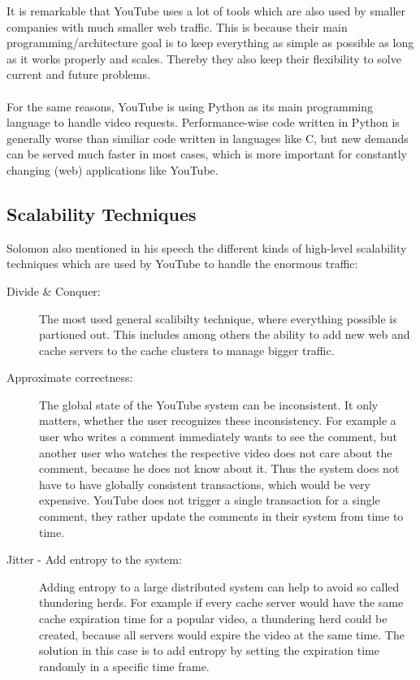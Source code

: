 It is remarkable that YouTube uses a lot of tools which are also used by smaller companies with much smaller web traffic. This is because their main programming/architecture goal is to keep everything as simple as possible as long as it works properly and scales. Thereby they also keep their flexibility to solve current and future problems.\\
\\
For the same reasons, YouTube is using Python as its main programming language to handle video requests. Performance-wise code written in Python is generally worse than similiar code written in languages like C, but new demands can be served much faster in most cases, which is more important for constantly changing (web) applications like YouTube.

\subsection{Scalability Techniques}

Solomon also mentioned in his speech the different kinds of high-level scalability techniques which are used by YouTube to handle the enormous traffic:

\begin{description}
  \item[Divide \& Conquer:] The most used general scalibilty technique, where everything possible is partioned out. This includes among others the ability to add new web and cache servers to the cache clusters to manage bigger traffic.

  \item[Approximate correctness:] The global state of the YouTube system can be inconsistent. It only matters, whether the user recognizes these inconsistency. For example a user who writes a comment immediately wants to see the comment, but another user who watches the respective video does not care about the comment, because he does not know about it. Thus the system does not have to have globally consistent transactions, which would be very expensive. YouTube does not trigger a single transaction for a single comment, they rather update the comments in their system from time to time.

  \item[Jitter - Add entropy to the system:] Adding entropy to a large dis\-tri\-bu\-ted system can help to avoid so called thundering herds. For example if every cache server would have the same cache expiration time for a popular video, a thundering herd could be created, because all servers would expire the video at the same time. The solution in this case is to add entropy by setting the expiration time randomly in a specific time frame.
\end{description}

